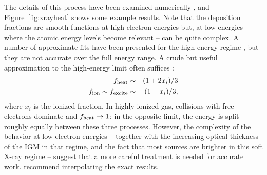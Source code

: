 \documentclass[a4paper,openany, 12pt]{book}
\begin{document}
The details of this process have been examined numerically \cite{shull85,valdes08,furl10-xray}, and Figure~\ref{fig:xrayheat} shows some example results. Note that the deposition fractions are smooth functions at high electron energies but, at low energies -- where the atomic energy levels become relevant -- can be quite complex. A number of approximate fits have been presented for the high-energy regime \cite{ricotti02, volonteri09}, but they are not accurate over the full energy range. A crude but useful approximation to the high-energy limit often suffices \cite{chen04-decay}:
\begin{eqnarray}
f_{\rm heat} & \sim & (1+2 x_i)/3 \nonumber \\
f_{\rm ion} \sim f_{\rm excite} & \sim & (1-x_i)/3,
\label{eq:fxapprox}
\end{eqnarray}
where $x_i$ is the ionized fraction. In highly ionized gas, collisions with free electrons dominate and $f_{\rm heat} \rightarrow 1$; in the opposite limit, the energy is split roughly equally between these three processes. However, the complexity of the behavior at low electron energies -- together with the increasing optical thickness of the IGM in that regime, and the fact that most sources are brighter in this soft X-ray regime -- suggest that a more careful treatment is needed for accurate work. \cite{furl10-xray} recommend interpolating the exact results.



\end{document}
